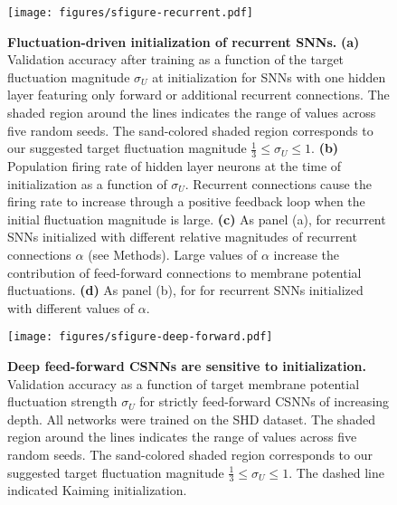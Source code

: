 \documentclass[11pt,a4paper]{article}
\begin{document}
\begin{refsection}
\begin{figure}[htb]
	\texttt{[image: figures/sfigure-recurrent.pdf]}
\caption{
\textbf{Fluctuation-driven initialization of recurrent \acp{SNN}.}
	\textbf{(a)} Validation accuracy after training as a function of the target fluctuation magnitude $\sigma_U$ at initialization for \acp{SNN} with one hidden layer featuring only forward or additional recurrent connections. The shaded region around the lines indicates the range of values across five random seeds. The sand-colored shaded region corresponds to our suggested target fluctuation magnitude $ \frac{1}{3}\le \sigma_U\le 1$.
	\textbf{(b)} Population firing rate of hidden layer neurons at the time of initialization as a function of $\sigma_U$. Recurrent connections cause the firing rate to increase through a positive feedback loop when the initial fluctuation magnitude is large.
	\textbf{(c)} As panel (a), for recurrent \acp{SNN} initialized with different relative magnitudes of recurrent connections $\alpha$ (see Methods). Large values of $\alpha$ increase the contribution of feed-forward connections to membrane potential fluctuations. 
	\textbf{(d)} As panel (b), for for recurrent \acp{SNN} initialized with different values of $\alpha$.
}
\label{sfig:recurrent}
\end{figure}

\begin{figure}[htb]
	\texttt{[image: figures/sfigure-deep-forward.pdf]}
\caption{
\textbf{Deep feed-forward \acp{CSNN} are sensitive to initialization.}
Validation accuracy as a function of target membrane potential fluctuation strength $\sigma_U$ for strictly feed-forward CSNNs of increasing depth. All networks were trained on the SHD dataset. The shaded region around the lines indicates the range of values across five random seeds. The sand-colored shaded region corresponds to our suggested target fluctuation magnitude $ \frac{1}{3}\le \sigma_U\le 1$. The dashed line indicated Kaiming initialization.
}
\label{sfig:deep-forward}
\end{figure}



\end{refsection}
\end{document}
